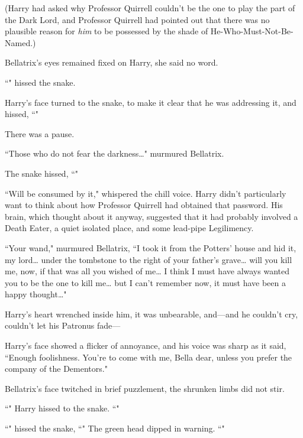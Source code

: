 (Harry had asked why Professor Quirrell couldn't be the one to play the part of the Dark Lord, and Professor Quirrell had pointed out that there was no plausible reason for \emph{him} to be possessed by the shade of He-Who-Must-Not-Be-Named.)

Bellatrix's eyes remained fixed on Harry, she said no word.

``" hissed the snake.

Harry's face turned to the snake, to make it clear that he was addressing it, and hissed, ``"

There was a pause.

``Those who do not fear the darkness{\ldots}" murmured Bellatrix.

The snake hissed, ``"

``Will be consumed by it," whispered the chill voice. Harry didn't particularly want to think about how Professor Quirrell had obtained that password. His brain, which thought about it anyway, suggested that it had probably involved a Death Eater, a quiet isolated place, and some lead-pipe Legilimency.

``Your wand," murmured Bellatrix, ``I took it from the Potters' house and hid it, my lord{\ldots} under the tombstone to the right of your father's grave{\ldots} will you kill me, now, if that was all you wished of me{\ldots} I think I must have always wanted you to be the one to kill me{\ldots} but I can't remember now, it must have been a happy thought{\ldots}"

Harry's heart wrenched inside him, it was unbearable, and—and he couldn't cry, couldn't let his Patronus fade—

Harry's face showed a flicker of annoyance, and his voice was sharp as it said, ``Enough foolishness. You're to come with me, Bella dear, unless you prefer the company of the Dementors."

Bellatrix's face twitched in brief puzzlement, the shrunken limbs did not stir.

``" Harry hissed to the snake. ``"

``" hissed the snake, ``" The green head dipped in warning. ``"

